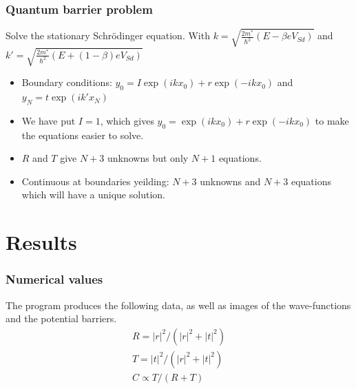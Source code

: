 \documentclass[•]{beamer}
\theoremstyle{remark}
\begin{document}
\begin{frame}\frametitle{Quantum barrier problem}
\begin{block}

Solve the stationary Schr\"odinger equation. With $k=\sqrt{\frac{2m^*}{\hbar^2}(E-\beta e V_{Sd})}$ and $k'=\sqrt{\frac{2m^*}{\hbar^2}(E+ (1-\beta) e V_{Sd})}$ 
\pause
\begin{itemize}
\item Boundary conditions: $y_{0} = I\exp{(i k x_{0})} + r\exp{(-i k x_{0})}$ and $y_{N} = t\exp{(i k' x_{N})}$
\pause
\item We have put $I=1$, which gives $y_{0} = \exp{(i k x_{0})} + r\exp{(-i k x_{0})}$ to make the equations easier to solve.
\pause
\item $R$ and $T$ give $N+3$ unknowns but only $N+1$ equations. 
\pause
\item Continuous at boundaries yeilding: $N+3$ unknowns and $N+3$ equations which will have a unique solution.
\end{itemize}
\end{block}
\end{frame}

\section{Results}
\begin{frame}\frametitle{Numerical values}
\begin{block}

The program produces the following data, as well as images of the wave-functions and the potential barriers.
\begin{eqnarray*}
R=|r|^2/(|r|^2+|t|^2)\\
T=|t|^2/(|r|^2+|t|^2)\\
C \propto T/(R+T)
\end{eqnarray*}
\end{block}
\end{frame}
\end{document}
